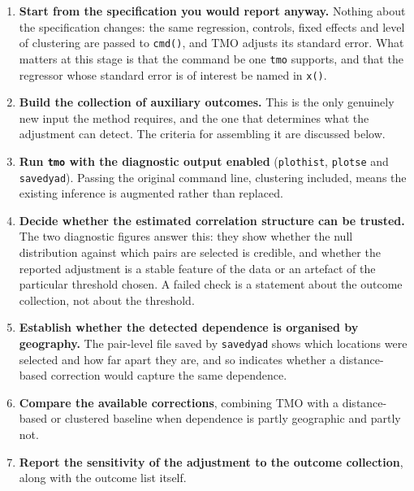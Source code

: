\documentclass[varwidth,bib]{statapress}
\begin{document}
\begin{enumerate}
  \item \textbf{Start from the specification you would report anyway.}  Nothing about the specification changes: the same regression, controls, fixed effects and level of clustering are passed to {\tt cmd()}, and TMO adjusts its standard error.  What matters at this stage is that the command be one {\tt tmo} supports, and that the regressor whose standard error is of interest be named in {\tt x()}.
  \item \textbf{Build the collection of auxiliary outcomes.}  This is the only genuinely new input the method requires, and the one that determines what the adjustment can detect.  The criteria for assembling it are discussed below.
  \item \textbf{Run {\tt tmo} with the diagnostic output enabled} ({\tt plothist}, {\tt plotse} and {\tt savedyad}).  Passing the original command line, clustering included, means the existing inference is augmented rather than replaced.
  \item \textbf{Decide whether the estimated correlation structure can be trusted.}  The two diagnostic figures answer this: they show whether the null distribution against which pairs are selected is credible, and whether the reported adjustment is a stable feature of the data or an artefact of the particular threshold chosen.  A failed check is a statement about the outcome collection, not about the threshold.
  \item \textbf{Establish whether the detected dependence is organised by geography.}  The pair-level file saved by {\tt savedyad} shows which locations were selected and how far apart they are, and so indicates whether a distance-based correction would capture the same dependence.
  \item \textbf{Compare the available corrections}, combining TMO with a distance-based or clustered baseline when dependence is partly geographic and partly not.
  \item \textbf{Report the sensitivity of the adjustment to the outcome collection}, along with the outcome list itself.
\end{enumerate}
\end{document}
